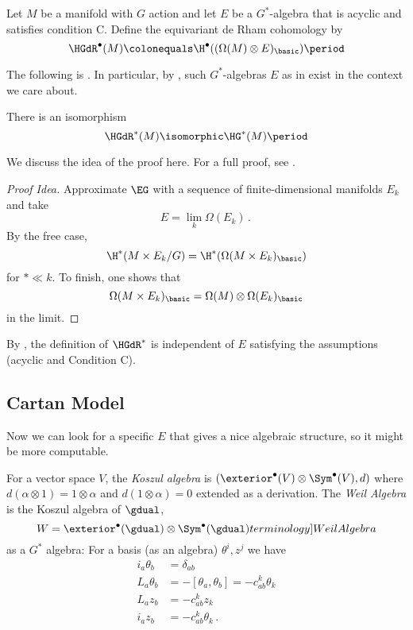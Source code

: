 \begin{definition}\label{def-Conditionc}
Let $M$ be a manifold with $G$ action and 
let $E$ be a $G^*$-algebra that is acyclic and satisfies condition C. 
Define the equivariant de Rham cohomology by
\[
	\HGdR^\bullet(M)\colonequals \H^\bullet((\Omega(M)\otimes E)_{\basic}) \period
\]
\end{definition}

The following is \cite[Theorem 2.5.1]{MR1689252}. In particular, by \cite[Prop. 2.5.4]{MR1689252}, such $G^*$-algebras $E$ as in  exist in the context we care about. 
\begin{thm}
	There is an isomorphism 
	\[
		\HGdR^*(M)\isomorphic\HG^*(M) \period
	\]
\end{thm}

We discuss the idea of the proof here. For a full proof, see \cite[\S 2.5]{MR1689252}. 
\begin{proof}[Proof Idea]
Approximate $\EG$ with a sequence of finite-dimensional manifolds $E_k$ and take \[E = \lim_k \Omega(E_k)\period\]
By the free case,
\[
	\H^*(M\times E_k/G)=\H^*(\Omega(M\times E_k)_{\basic})
\] for $* \ll k$. 
To finish, one shows that
\[
	\Omega(M\times E_k)_{\basic}=\Omega(M)\otimes\Omega(E_k)_{\basic}
\]
in the limit.
\end{proof}

\begin{rmk}
By \cite[\S 4.4]{MR1689252}, the definition of $\HGdR^*$ is independent of $E$ satisfying the assumptions (acyclic and Condition C).
\end{rmk}


\subsection{Cartan Model}

Now we can look for a specific $E$ that gives a nice algebraic structure, so it might be more computable.

For a vector space $V$, the \emph{Koszul algebra} is $(\exterior^\bullet(V)\otimes \Sym^\bullet(V),d)$ where $d(\alpha\otimes 1)=1\otimes \alpha$ and $d(1\otimes\alpha)=0$ extended as a derivation.  The \emph{Weil Algebra} is the Koszul algebra of $\gdual$, 
\[W=\exterior^\bullet(\gdual)\otimes\Sym^\bullet(\gdual)  \index[terminology]{Weil Algebra}\]
as a $G^*$ algebra: For a basis (as an algebra) $\theta^i, z^j$ we have
\begin{align*}
	i_a\theta_b &= \delta_{ab}\\
	L_a\theta_b &= -[\theta_a,\theta_b]=-c_{ab}^k\theta_k\\
	L_az_b &= -c_{ab}^k z_k \\
	i_az_b &= -c_{ab}^k\theta_k \period
\end{align*}

